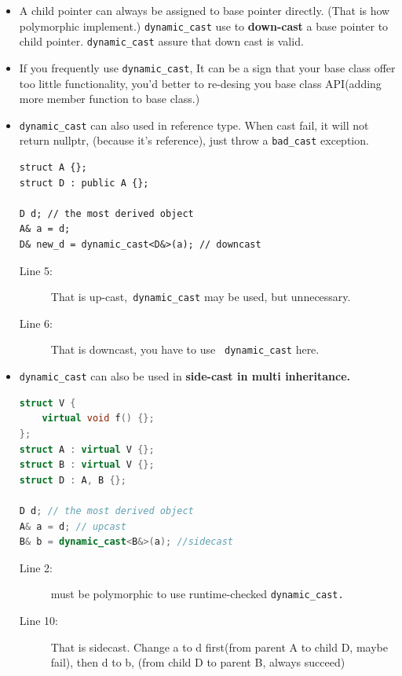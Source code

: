 \documentclass[a4paper,11pt,twoside]{book}
\begin{document}
\begin{itemize}
	\item A child pointer can always be assigned to base pointer directly. (That is how polymorphic implement.) \texttt{dynamic\_cast} use to \textbf{down-cast} a base pointer to child pointer. \texttt{dynamic\_cast} assure that down cast is valid. 
	
	\item If you frequently use \texttt{dynamic\_cast}, It can be a sign that your base class offer too little functionality, you'd better to re-desing you base class API(adding more member function to base class.)
	
	\item \texttt{dynamic\_cast} can also used in reference type. When cast fail, it will not return nullptr, (because it's reference), just throw a \texttt{bad\_cast} exception.
	
\begin{lstlisting}
struct A {};
struct D : public A {};

D d; // the most derived object
A& a = d;
D& new_d = dynamic_cast<D&>(a); // downcast
\end{lstlisting}
\begin{description}
	\item[Line 5:] That is up-cast,\texttt{ dynamic\_cast} may be used, but unnecessary.
	\item[Line 6:] That is downcast, you have to use \texttt{ dynamic\_cast} here. 
\end{description}
	
	
	\item \texttt{dynamic\_cast} can also be used in \textbf{side-cast in multi inheritance. }
\begin{lstlisting}[frame=single, language=c++, mathescape=true]
struct V {
	virtual void f() {};
};
struct A : virtual V {};
struct B : virtual V {};
struct D : A, B {};
	
D d; // the most derived object
A& a = d; // upcast 
B& b = dynamic_cast<B&>(a); //sidecast
	\end{lstlisting}
\begin{description}
	\item[Line 2:] must be polymorphic to use runtime-checked \texttt{dynamic\_cast.}
	
	\item[Line 10:] That is sidecast. Change a to d first(from parent A to child D, maybe fail), then d to b, (from child D to parent B, always succeed)
	
\end{description}
	

\end{itemize}
\end{document}
